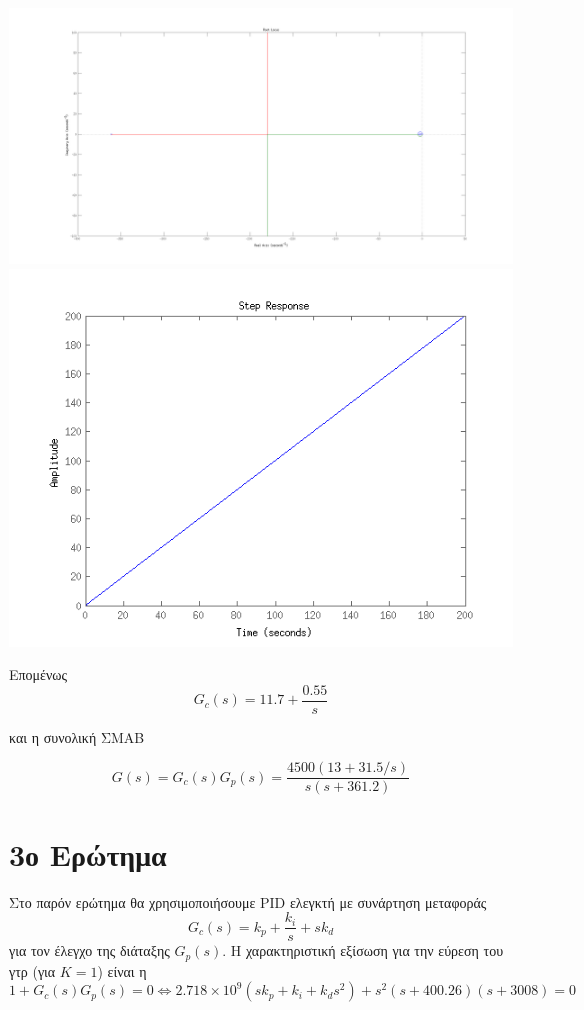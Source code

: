 \documentclass[a4paper,oneside, 10pt]{article}
\begin{document}
 \includegraphics[width=\textwidth]{pi_rlocus.png}
 \includegraphics[width=\textwidth]{step2.png}

Επομένως $$G_c(s) = 11.7 + \frac {0.55} s$$

και η συνολική ΣΜΑΒ

$$G(s) = G_c(s) G_p(s) = \frac {4500(13 + 31.5 / s)}  {s (s + 361.2)}$$



\section*{3ο Ερώτημα} 

Στο παρόν ερώτημα θα χρησιμοποιήσουμε PID ελεγκτή με συνάρτηση μεταφοράς $$G_c(s) = k_p + \frac {k_i} s + s k_d$$ για τον έλεγχο της διάταξης $G_p(s)$. Η χαρακτηριστική εξίσωση για την εύρεση του γτρ (για $K = 1$) είναι η $$1 + G_c(s) G_p(s) = 0 \iff 2.718 \times 10^9 (s k_p + k_i + k_d s^2) + s^2 (s + 400.26) (s + 3008) = 0$$
\end{document}
